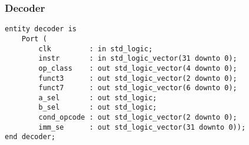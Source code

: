 \subsubsection{Decoder}
\begin{code}
\label{code:ID_decoder}  
\begin{verbatim}
entity decoder is
    Port (
        clk         : in std_logic;
        instr       : in std_logic_vector(31 downto 0);
        op_class    : out std_logic_vector(4 downto 0);
        funct3      : out std_logic_vector(2 downto 0);
        funct7      : out std_logic_vector(6 downto 0);
        a_sel       : out std_logic;
        b_sel       : out std_logic;
        cond_opcode : out std_logic_vector(2 downto 0);
        imm_se      : out std_logic_vector(31 downto 0));
end decoder;


\end{verbatim}
\end{code}
